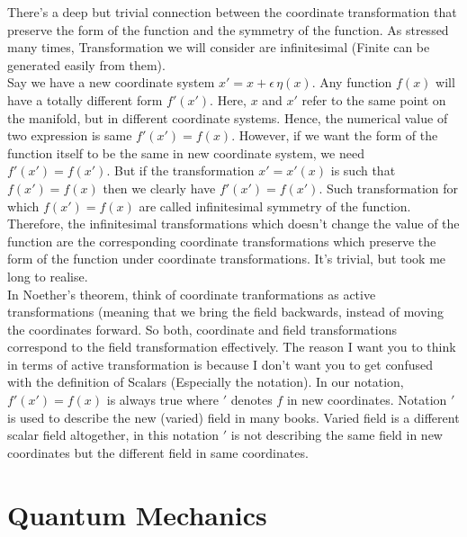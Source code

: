 \documentclass{report}
\begin{document}
There's a deep but trivial connection between the coordinate transformation that preserve the form of the function and the symmetry of the function. As stressed many times, Transformation we will consider are infinitesimal (Finite can be generated easily from them).\\

\noindent Say we have a new coordinate system $x' = x + \epsilon \, \eta(x)$. Any function $f(x)$ will have a totally different form $f'(x')$. Here, $x$ and $x'$ refer to the same point on the manifold, but in different coordinate systems. Hence, the numerical value of two expression is same $f'(x') = f(x)$. However, if we want the form of the function itself to be the same in new coordinate system, we need $f'(x') = f(x')$. But if the transformation $x'=x'(x)$ is such that $f(x') = f(x)$ then we clearly have $f'(x') = f(x')$. Such transformation for which $f(x') = f(x)$ are called infinitesimal symmetry of the function. Therefore, the infinitesimal transformations which doesn't change the value of the function are the corresponding coordinate transformations which preserve the form of the function under coordinate transformations. It's trivial, but took me long to realise.\\

\noindent In Noether's theorem, think of coordinate tranformations as active transformations (meaning that we bring the field backwards, instead of moving the coordinates forward. So both, coordinate and field transformations correspond to the field transformation effectively. The reason I want you to think in terms of active transformation is because I don't want you to get confused with the definition of Scalars (Especially the notation). In our notation, $f'(x') = f(x)$ is always true where $'$ denotes $f$ in new coordinates. Notation $'$ is  used to describe the new (varied) field in many books. Varied field is a different scalar field altogether, in this notation $'$ is not describing the same field in new coordinates but the different field in same coordinates.

\chapter{Quantum Mechanics}
\end{document}
